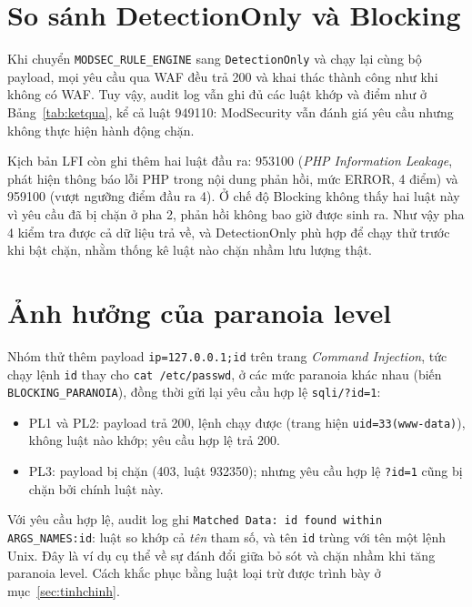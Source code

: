 \section{So sánh DetectionOnly và Blocking}
Khi chuyển \texttt{MODSEC\_RULE\_ENGINE} sang \texttt{DetectionOnly} và chạy lại cùng bộ payload, mọi yêu cầu qua WAF đều trả 200 và khai thác thành công như khi không có WAF. Tuy vậy, audit log vẫn ghi đủ các luật khớp và điểm như ở Bảng~\ref{tab:ketqua}, kể cả luật 949110: ModSecurity vẫn đánh giá yêu cầu nhưng không thực hiện hành động chặn.

Kịch bản LFI còn ghi thêm hai luật đầu ra: 953100 (\textit{PHP Information Leakage}, phát hiện thông báo lỗi PHP trong nội dung phản hồi, mức ERROR, 4 điểm) và 959100 (vượt ngưỡng điểm đầu ra 4). Ở chế độ Blocking không thấy hai luật này vì yêu cầu đã bị chặn ở pha 2, phản hồi không bao giờ được sinh ra. Như vậy pha 4 kiểm tra được cả dữ liệu trả về, và DetectionOnly phù hợp để chạy thử trước khi bật chặn, nhằm thống kê luật nào chặn nhầm lưu lượng thật.

\section{Ảnh hưởng của paranoia level}\label{sec:pl}
Nhóm thử thêm payload \texttt{ip=127.0.0.1;id} trên trang \textit{Command Injection}, tức chạy lệnh \texttt{id} thay cho \texttt{cat /etc/passwd}, ở các mức paranoia khác nhau (biến \texttt{BLOCKING\_PARANOIA}), đồng thời gửi lại yêu cầu hợp lệ \texttt{sqli/?id=1}:
\begin{itemize}
\item PL1 và PL2: payload trả 200, lệnh chạy được (trang hiện \texttt{uid=33(www-data)}), không luật nào khớp; yêu cầu hợp lệ trả 200.
\item PL3: payload bị chặn (403, luật 932350); nhưng yêu cầu hợp lệ \texttt{?id=1} cũng bị chặn bởi chính luật này.
\end{itemize}

Với yêu cầu hợp lệ, audit log ghi \texttt{Matched Data: id found within ARGS\_NAMES:id}: luật so khớp cả \emph{tên} tham số, và tên \texttt{id} trùng với tên một lệnh Unix. Đây là ví dụ cụ thể về sự đánh đổi giữa bỏ sót và chặn nhầm khi tăng paranoia level. Cách khắc phục bằng luật loại trừ được trình bày ở mục~\ref{sec:tinhchinh}.
